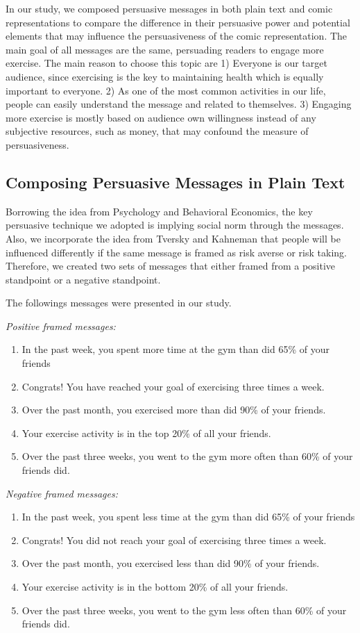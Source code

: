 
In our study, we composed persuasive messages in both plain text and comic representations to compare the difference in their persuasive power and potential elements that may influence the persuasiveness of the comic representation. The main goal of all messages are the same, persuading readers to engage more exercise. The main reason to choose this topic are 1) Everyone is our target audience, since exercising is the key to maintaining health which is equally important to everyone. 2) As one of the most common activities in our life, people can easily understand the message and related to themselves. 3) Engaging more exercise is mostly based on audience own willingness instead of any subjective resources, such as money, that may confound the measure of persuasiveness.\par
\subsection{Composing Persuasive Messages in Plain Text}
Borrowing the idea from Psychology and Behavioral Economics, the key persuasive technique we adopted is implying social norm through the messages. Also, we incorporate the idea from Tversky and Kahneman that people will be influenced differently if the same message is framed as risk averse or risk taking. Therefore, we created two sets of messages that either framed from a positive standpoint or a negative standpoint. \par
The followings messages were presented in our study.\par
\textit{Positive framed messages:}
\begin{enumerate}
  \item In the past week, you spent more time at the gym than did 65\% of your friends
  \item Congrats! You have reached your goal of exercising three times a week.
  \item Over the past month, you exercised more than did 90\% of your friends.
  \item Your exercise activity is in the top 20\% of all your friends.
  \item Over the past three weeks, you went to the gym more often than 60\% of your friends did.
\end{enumerate}\par
\textit{Negative framed messages:}
\begin{enumerate}
\item	In the past week, you spent less time at the gym than did 65\% of your friends
\item Congrats! You did not reach your goal of exercising three times a week.
\item	Over the past month, you exercised less than did 90\% of your friends.
\item	Your exercise activity is in the bottom 20\% of all your friends.
\item	Over the past three weeks, you went to the gym less often than 60\% of your friends did.
\end{enumerate}\par
